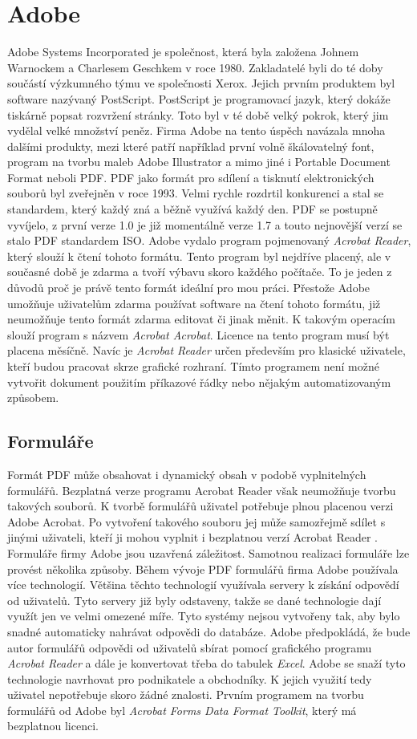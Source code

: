 \documentclass[czech,BP]{thesiskiv}
\begin{document}
\section{Adobe}
Adobe Systems Incorporated je společnost, která byla založena Johnem Warnockem a Charlesem Geschkem  v roce 1980. Zakladatelé byli do té doby součástí výzkumného týmu ve společnosti Xerox. Jejich prvním produktem byl software nazývaný PostScript. PostScript je programovací jazyk, který dokáže tiskárně popsat rozvržení stránky. Toto byl v té době velký pokrok, který jim vydělal velké množství peněz. Firma Adobe na tento úspěch navázala mnoha dalšími produkty, mezi které patří například první volně škálovatelný font, program na tvorbu maleb Adobe Illustrator a mimo jiné i Portable Document Format neboli PDF. 
\cite{Adobe_story}
PDF jako formát pro sdílení a tisknutí elektronických souborů byl zveřejněn v roce 1993. Velmi rychle rozdrtil konkurenci a stal se standardem, který každý zná a běžně využívá každý den. PDF se postupně vyvíjelo, z první verze 1.0 je již momentálně verze 1.7 a touto nejnovější verzí se stalo PDF standardem ISO. Adobe vydalo program pojmenovaný \emph{Acrobat Reader}, který slouží k čtení tohoto formátu. Tento program byl nejdříve placený, ale v současné době je zdarma a tvoří výbavu skoro každého počítače. To je jeden z důvodů proč je právě tento formát ideální pro mou práci.
\cite{Adobe_history}
Přestože Adobe umožňuje uživatelům zdarma používat software na čtení tohoto formátu, již neumožňuje tento formát zdarma editovat či jinak měnit. K takovým operacím slouží program s názvem \emph{Acrobat Acrobat}. Licence na tento program musí být placena měsíčně. Navíc je \emph{Acrobat Reader} určen především pro klasické uživatele, kteří budou pracovat skrze grafické rozhraní. Tímto programem není možné vytvořit dokument použitím příkazové řádky nebo nějakým automatizovaným způsobem. 

\subsection{Formuláře}
Formát PDF může obsahovat i dynamický obsah v podobě vyplnitelných formulářů. Bezplatná verze programu Acrobat Reader však neumožňuje tvorbu takových souborů. K tvorbě formulářů uživatel potřebuje plnou placenou verzi Adobe Acrobat. Po vytvoření takového souboru jej může samozřejmě sdílet s jinými uživateli, kteří ji mohou vyplnit i bezplatnou verzí Acrobat Reader \cite{Adobe_forms}. 
Formuláře firmy Adobe jsou uzavřená záležitost. Samotnou realizaci formuláře lze provést několika způsoby. Během vývoje PDF formulářů firma Adobe používala více technologií. Většina těchto technologií využívala servery k získání odpovědí od uživatelů. Tyto servery již byly odstaveny, takže se dané technologie dají využít jen ve velmi omezené míře. Tyto systémy nejsou vytvořeny tak, aby bylo snadné automaticky nahrávat odpovědi do databáze. Adobe předpokládá, že bude autor formulářů odpovědi od uživatelů sbírat pomocí grafického programu \emph{Acrobat Reader} a dále je konvertovat třeba do tabulek \emph{Excel}. Adobe se snaží tyto technologie navrhovat pro podnikatele a obchodníky. K jejich využití tedy uživatel nepotřebuje skoro žádné znalosti. Prvním programem na tvorbu formulářů od Adobe byl \emph{Acrobat Forms Data Format Toolkit}, který má bezplatnou licenci.
\end{document}
